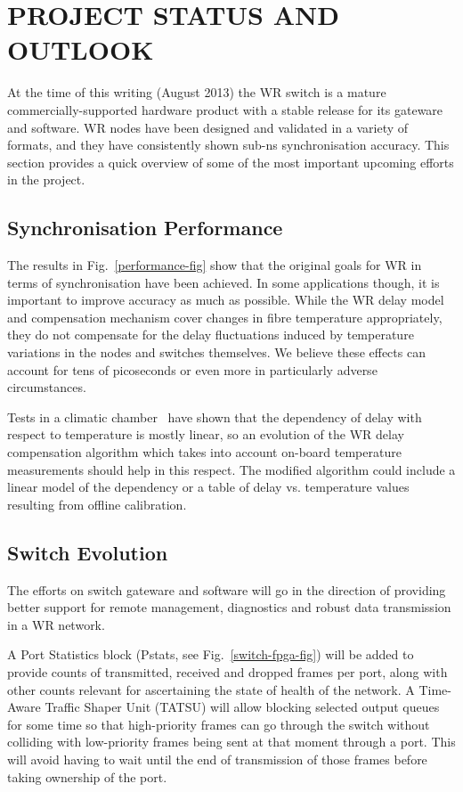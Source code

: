 \documentclass{../JAC2003}
\begin{document}
\section{PROJECT STATUS AND OUTLOOK}

At the time of this writing (August 2013) the WR switch is a mature
commercially-supported hardware product with a stable release for its
gateware and software. WR nodes have been designed and validated in a
variety of formats, and they have consistently shown sub-ns
synchronisation accuracy. This section provides a quick overview of
some of the most important upcoming efforts in the project.

\subsection{Synchronisation Performance}

The results in Fig.~\ref{performance-fig} show that the original goals
for WR in terms of synchronisation have been achieved. In some
applications though, it is important to improve accuracy as much as
possible. While the WR delay model~\cite{wr-spec-ref} and compensation
mechanism cover changes in fibre temperature appropriately, they do
not compensate for the delay fluctuations induced by temperature
variations in the nodes and switches themselves. We believe these
effects can account for tens of picoseconds or even more in
particularly adverse circumstances.

Tests in a climatic chamber~\cite{torture-ref} have shown that the
dependency of delay with respect to temperature is mostly linear, so
an evolution of the WR delay compensation algorithm which takes into
account on-board temperature measurements should help in this
respect. The modified algorithm could include a linear model of the
dependency or a table of delay vs. temperature values resulting from
offline calibration.

\subsection{Switch Evolution}

The efforts on switch gateware and software will go in the direction
of providing better support for remote management, diagnostics and
robust data transmission in a WR network. 

A Port Statistics block (Pstats, see Fig.~\ref{switch-fpga-fig}) will
be added to provide counts of transmitted, received and dropped frames
per port, along with other counts relevant for ascertaining the state
of health of the network. A Time-Aware Traffic Shaper Unit (TATSU)
will allow blocking selected output queues for some time so that
high-priority frames can go through the switch without colliding with
low-priority frames being sent at that moment through a port. This
will avoid having to wait until the end of transmission of those
frames before taking ownership of the port.
\end{document}
